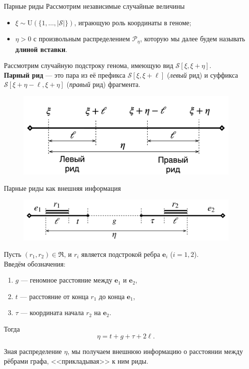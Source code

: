 \documentclass[unicode, notheorems]{beamer}
\begin{document}
\begin{frame}{Парные риды}
Рассмотрим независимые случайные величины
\begin{itemize}
	\item $\xi \sim \mathrm{U}(\{ 1, \ldots, |\mathcal{S}|\})$, играющую роль координаты в геноме;
	\item $\eta > 0$ с произвольным распределением $\mathcal{P}_{\eta}$, которую мы далее будем называть \textbf{длиной вставки}.
\end{itemize}

\begin{block}{}
		Рассмотрим случайную подстроку генома, имеющую вид $\mathcal{S}[\xi, \xi+\eta]$.\\
		\medskip
		\textbf{Парный рид} --- это пара из её префикса $\mathcal{S}[\xi, \xi+\ell]$  (\textit{левый} рид) и суффикса $\mathcal{S}[\xi+\eta-\ell, \xi+\eta]$ (\textit{правый} рид)  фрагмента.
\end{block}
\begin{figure}
	\includegraphics[scale=0.12]{fig/fragment}
\end{figure}
\end{frame}

\begin{frame}{Парные риды как внешняя информация}
\begin{figure}
	\centering
	\includegraphics[scale=0.2]{img/alignment_shifted}
\end{figure}

Пусть $(r_1, r_2) \in \mathfrak{R}$, и $r_i$ является подстрокой ребра $\mathbf{e}_i$ ($i=1,2$). \\
\medskip
Введём обозначения: 
\begin{enumerate}
	\item $g$ --- геномное расстояние между $\mathbf{e}_1$ и $\mathbf{e}_2$,
	\item $t$ --- расстояние от конца $r_1$ до конца $\mathbf{e}_1$,
	\item $\tau$ --- координата начала $r_2$ на $\mathbf{e}_2$.
\end{enumerate}
Тогда \[ \eta = t + g + \tau + 2\ell. \]

{\color{blue} Зная распределение $\eta$, мы получаем внешнюю информацию о расстоянии между рёбрами графа, <<прикладывая>> к ним риды.}

\end{frame}
\end{document}
